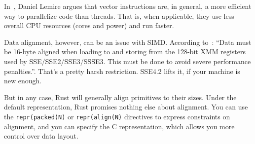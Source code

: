 In~\cite{lemire18:_multic_simd}, Daniel Lemire argues that vector
instructions are, in general, a more efficient way to parallelize code
than threads. That is, when applicable, they use less overall CPU
resources (cores and power) and run faster.

Data alignment, however, can be an issue with SIMD. According to~\cite{sse}: ``Data must be 16-byte aligned when loading to and storing from the 128-bit XMM registers used by SSE/SSE2/SSE3/SSSE3. This must be done to avoid severe performance penalties.''. That's a pretty harsh restriction. SSE4.2 lifts it, if your machine is new enough.

But in any case, Rust will generally align primitives to their sizes. Under the default representation, Rust promises nothing else about alignment. You can use the \texttt{repr(packed(N)} or \texttt{repr(align(N)} directives to express constraints on alignment, and you can specify the C representation, which allows you more control over data layout.




